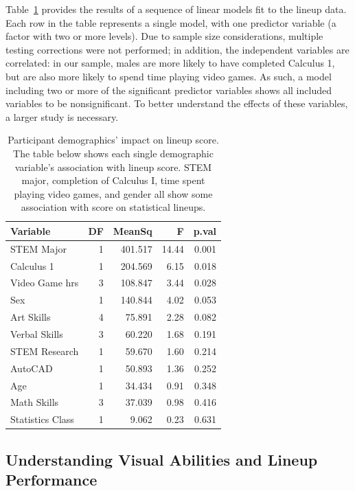\documentclass[11pt]{isuthesis}\usepackage[]{graphicx}\usepackage[]{color}
\begin{document}
Table~\ref{tab:ttest-demographics} provides the results of a sequence of linear models fit to the lineup data. Each row in the table represents a single model, with one predictor variable (a factor with two or more levels). Due to sample size considerations, multiple testing corrections were not performed; in addition, the independent variables are correlated: in our sample, males are more likely to have completed Calculus 1, but are also more likely to spend time playing video games. As such, a model including two or more of the significant predictor variables shows all included variables to be nonsignificant. To better understand the effects of these variables, a larger study is necessary. 
\begin{table}[ht]
\centering
\caption{Participant demographics' impact on lineup score. The table below shows each single demographic variable's association with lineup score. STEM major, completion of Calculus I, time spent playing video games, and gender all show some association with score on statistical lineups. \label{tab:ttest-demographics}} 
\begin{tabular}{lrrrr}
  \hline
Variable & DF & MeanSq & F & p.val \\ 
  \hline
STEM Major & 1 & 401.517 & 14.44 & 0.001 \\ 
  Calculus 1 & 1 & 204.569 & 6.15 & 0.018 \\ 
  Video Game hrs & 3 & 108.847 & 3.44 & 0.028 \\ 
  Sex & 1 & 140.844 & 4.02 & 0.053 \\ 
  Art Skills & 4 & 75.891 & 2.28 & 0.082 \\ 
  Verbal Skills & 3 & 60.220 & 1.68 & 0.191 \\ 
  STEM Research & 1 & 59.670 & 1.60 & 0.214 \\ 
  AutoCAD & 1 & 50.893 & 1.36 & 0.252 \\ 
  Age & 1 & 34.434 & 0.91 & 0.348 \\ 
  Math Skills & 3 & 37.039 & 0.98 & 0.416 \\ 
  Statistics Class & 1 & 9.062 & 0.23 & 0.631 \\ 
   \hline
\end{tabular}
\end{table}



\subsection{Understanding Visual Abilities and Lineup Performance}
\end{document}
